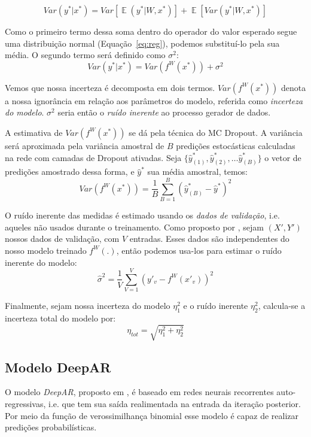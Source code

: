 \[ Var(y^* | x^*) = Var[\mathop{\mathbb{E}}(y^* | W,x^*)] +
  \mathop{\mathbb{E}}[Var(y^* | W,x^*)] \]

Como o primeiro termo dessa soma dentro do operador do valor esperado segue uma distribuição normal
(Equação~\ref{eq:reg}), podemos substituí-lo pela sua média. O
segundo termo será definido como $\sigma^2$: \\ 
 
\[ Var(y^* | x^*) = Var(f^W(x^*)) + \sigma^2 \] 


Vemos que nossa incerteza é decomposta em dois termos. $Var(f^W(x^*))$ denota a
nossa ignorância em relação aos parâmetros do modelo, referida como
\textit{incerteza do modelo}. $\sigma^2$ seria então o \textit{ruído inerente} ao
processo gerador de dados.
 
A estimativa de $Var(f^W(x^*))$ se dá pela técnica do MC Dropout. A variância
será aproximada pela variância amostral de $B$ predições estocásticas calculadas
na rede com camadas de Dropout ativadas. Seja $\{\hat{y}^*_{(1)},\hat{y}^*_{(2)}, \dots
\hat{y}^*_{(B)}\}$ o vetor de predições amostrado dessa forma, e $\hat{y}^*$ sua
média amostral, temos: \\

\[   Var(f^W(x^*))  = \frac{1}{B}\sum^B_{B=1}(\hat{y}^*_{(B)} - \hat{y}^*)^2  \]


O ruído inerente das medidas é estimado usando os \textit{dados de validação},
i.e. aqueles não
usados durante o treinamento. Como
proposto por \citep{ubertime}, sejam $(X',Y')$ nossos dados de validação, com
$V$ entradas. Esses dados são independentes do nosso modelo
treinado $f^W(.)$, então podemos usa-los para estimar o ruído inerente do
modelo: \\

\[ \hat{\sigma}^2 = \frac{1}{V}\sum^V_{V=1}(y'_v - f^W(x'_v))^2 \]

Finalmente, sejam nossa incerteza do modelo $\eta_1^2$ e o ruído inerente
$\eta^2_2$, calcula-se a incerteza total do modelo por: \\

\[  \eta_{tot} = \sqrt{  \eta_1^2 + \eta_2^2 }  \]


\subsection{Modelo DeepAR}

O modelo \textit{DeepAR}, proposto em \cite{deepar}, é baseado em redes neurais recorrentes auto-regressivas,
i.e. que tem sua saída realimentada na entrada da iteração posterior. Por meio da função de verossimilhança binomial esse modelo é capaz
de realizar predições probabilísticas.

